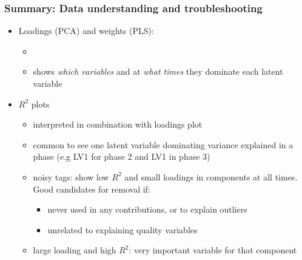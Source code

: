 \begin{frame}\frametitle{Summary: Data understanding and troubleshooting}
	
\begin{itemize}
	\item	Loadings (PCA) and weights (PLS):  
	
			\begin{itemize}
				
				\item	{}
				
				\item	shows \emph{which variables} and at \emph{what times} they dominate each latent variable
				
			\end{itemize}


	\item 	\( R^2 \) plots\hfill {}
		
			\begin{itemize}
				\item	interpreted in combination with loadings plot
				
				\item	common to see one latent variable dominating variance explained in a phase (e.g LV1 for phase 2 and LV1 in phase 3)
				
				\item	noisy tags: show low \( R^2  \) and small loadings in components at all times.  Good candidates for removal if:
				 		
						\begin{itemize}
							\item	never used in any contributions, or to explain outliers
							
							\item	unrelated to explaining quality variables
						\end{itemize}
				
				\item	large loading and high \( R^2 \): very important variable for that component
			\end{itemize}

\end{itemize}

\end{frame}


